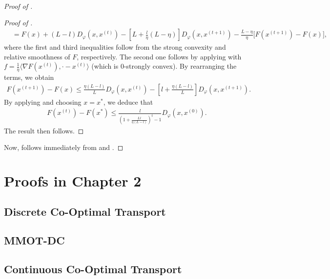 \begin{proof}[Proof of ]
\begin{proof}[Proof of ]
\begin{align}
    &= F(x) + (L - l) D_{\varphi}(x, x^{(t)})
    - \left[ L + \frac{l}{\eta}(L - \eta) \right] D_{\varphi}(x, x^{(t+1)})
    - \frac{L - \eta}{\eta} \big[ F(x^{(t+1)}) - F(x) \big],
\end{align}
where the first and third inequalities follow from the strong convexity and
relative smoothness of $F$, respectively. The second one follows by applying
 with
$f = \frac{1}{\eta} \langle \nabla F(x^{(t)}), \cdot - x^{(t)} \rangle$
(which is $0$-strongly convex). By rearranging the terms, we obtain
\begin{align}
    F(x^{(t+1)}) - F(x) \leq \frac{\eta(L-l)}{L} D_{\varphi}(x, x^{(t)})
    - \left[ l + \frac{\eta (L - l)}{L} \right] D_{\varphi}(x, x^{(t+1)}).
\end{align}
By applying  and choosing $x = x^*$, we deduce that
\begin{align}
    F(x^{(t)}) - F(x^*) \leq \frac{l}{\left( 1 + \frac{Ll }{\eta (L - l)} \right)^t - 1}
    D_{\varphi}(x, x^{(0)}).
\end{align}
The result then follows.
\end{proof}
Now,  follows immediately from  and
.
\end{proof}

\section{Proofs in Chapter 2}

\subsection{Discrete Co-Optimal Transport}

\subsection{MMOT-DC}

\subsection{Continuous Co-Optimal Transport}

